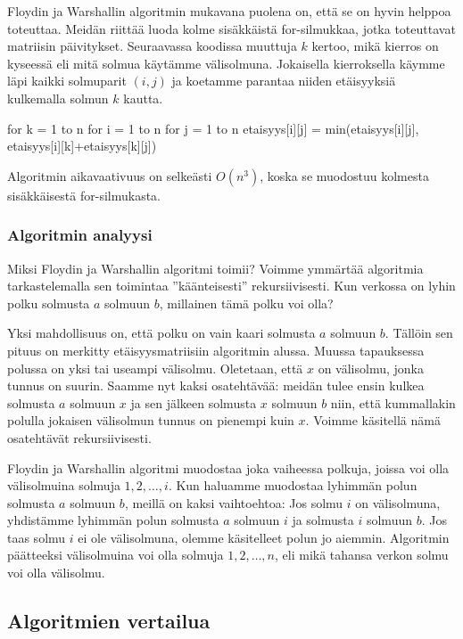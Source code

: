 Floydin ja Warshallin algoritmin mukavana puolena on,
että se on hyvin helppoa toteuttaa.
Meidän riittää luoda kolme sisäkkäistä for-silmukkaa,
jotka toteuttavat matriisin päivitykset.
Seuraavassa koodissa muuttuja $k$ kertoo,
mikä kierros on kyseessä eli mitä solmua käytämme välisolmuna.
Jokaisella kierroksella käymme läpi kaikki solmuparit $(i,j)$
ja koetamme parantaa niiden etäisyyksiä kulkemalla solmun $k$ kautta.

\begin{code}
for k = 1 to n
    for i = 1 to n
        for j = 1 to n
            etaisyys[i][j] = min(etaisyys[i][j],
                                   etaisyys[i][k]+etaisyys[k][j])
\end{code}

Algoritmin aikavaativuus on selkeästi $O(n^3)$,
koska se muodostuu kolmesta sisäkkäisestä for-silmukasta.

\subsubsection{Algoritmin analyysi}

Miksi Floydin ja Warshallin algoritmi toimii?
Voimme ymmärtää algoritmia tarkastelemalla
sen toimintaa ''käänteisesti'' rekursiivisesti.
Kun verkossa on lyhin polku solmusta $a$ solmuun $b$,
millainen tämä polku voi olla?

Yksi mahdollisuus on, että polku on vain kaari
solmusta $a$ solmuun $b$.
Tällöin sen pituus on merkitty etäisyysmatriisiin
algoritmin alussa.
Muussa tapauksessa polussa on yksi tai useampi välisolmu.
Oletetaan, että $x$ on välisolmu, jonka tunnus on suurin.
Saamme nyt kaksi osatehtävää:
meidän tulee ensin kulkea solmusta $a$ solmuun $x$
ja sen jälkeen solmusta $x$ solmuun $b$ niin,
että kummallakin polulla jokaisen välisolmun
tunnus on pienempi kuin $x$.
Voimme käsitellä nämä osatehtävät rekursiivisesti.

Floydin ja Warshallin algoritmi muodostaa joka vaiheessa
polkuja, joissa voi olla välisolmuina solmuja $1,2,\dots,i$.
Kun haluamme muodostaa lyhimmän polun solmusta $a$ solmuun $b$,
meillä on kaksi vaihtoehtoa:
Jos solmu $i$ on välisolmuna, yhdistämme lyhimmän polun
solmusta $a$ solmuun $i$ ja solmusta $i$ solmuun $b$.
Jos taas solmu $i$ ei ole välisolmuna, olemme käsitelleet
polun jo aiemmin.
Algoritmin päätteeksi välisolmuina voi olla solmuja $1,2,\dots,n$,
eli mikä tahansa verkon solmu voi olla välisolmu.

\subsection{Algoritmien vertailua}

